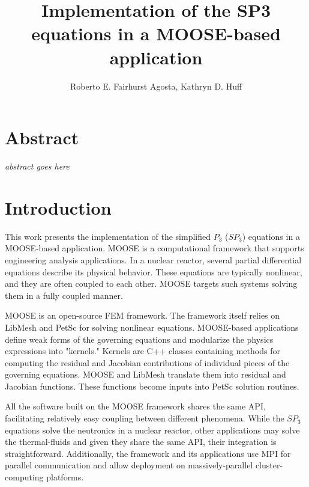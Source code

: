 \documentclass{anstrans}
\title{Implementation of the SP3 equations in a MOOSE-based application}
\author{Roberto E. Fairhurst Agosta, Kathryn D. Huff}
\institute{
University of Illinois at Urbana-Champaign, Dept. of Nuclear, Plasma, and Radiological Engineering\\
ref3@illinois.edu
}
\begin{document}

\section{Abstract}

\textit{abstract goes here}

\section{Introduction}

This work presents the implementation of the simplified $P_3$ ($SP_3$) equations \cite{gelbard_spherical_1960} in a \gls{MOOSE}-based application.
MOOSE \cite{gaston_moose_2009} is a computational framework that supports engineering analysis applications.
In a nuclear reactor, several partial differential equations describe its physical behavior.
These equations are typically nonlinear, and they are often coupled to each other.
MOOSE targets such systems solving them in a fully coupled manner.

MOOSE is an open-source \gls{FEM} framework.
The framework itself relies on LibMesh \cite{kirk_libmesh_2006} and PetSc \cite{balay_petsc_2016} for solving nonlinear equations.
MOOSE-based applications define weak forms of the governing equations and modularize the physics expressions into "kernels."
Kernels are C++ classes containing methods for computing the residual and Jacobian contributions of individual pieces of the governing equations.
MOOSE and LibMesh translate them into residual and Jacobian functions.
These functions become inputs into PetSc solution routines.

All the software built on the MOOSE framework shares the same \gls{API}, facilitating relatively easy coupling between different phenomena.
While the $SP_3$ equations solve the neutronics in a nuclear reactor, other applications may solve the thermal-fluids and given they share the same API, their integration is straightforward.
Additionally, the framework and its applications use \gls{MPI} for parallel communication and allow deployment on massively-parallel cluster-computing platforms.
\end{document}
